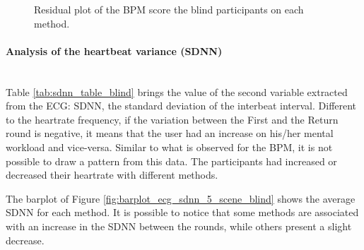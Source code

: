 \begin{figure}[!htb]
\begin{minipage}{0.45\textwidth}
        \caption{Residual plot of the BPM score the blind participants on each method.}
        \label{fig:residplot_bpm_two_way_blind}
    \end{minipage}
\end{figure}



%



%
%
\paragraph{Analysis of the heartbeat variance (SDNN)}\mbox{}\\
%
Table \ref{tab:sdnn_table_blind} brings the value of the second variable extracted from the ECG: SDNN, the standard deviation of the interbeat interval. Different to the heartrate frequency, if the variation between the First and the Return round is negative, it means that the user had an increase on his/her mental workload and vice-versa. Similar to what is observed for the BPM, it is not possible to draw a pattern from this data. The participants had increased or decreased their heartrate with different methods.



The barplot of Figure \ref{fig:barplot_ecg_sdnn_5_scene_blind} shows the average SDNN for each method. It is possible to notice that some methods are associated with an increase in the SDNN between the rounds, while others present a slight decrease.

